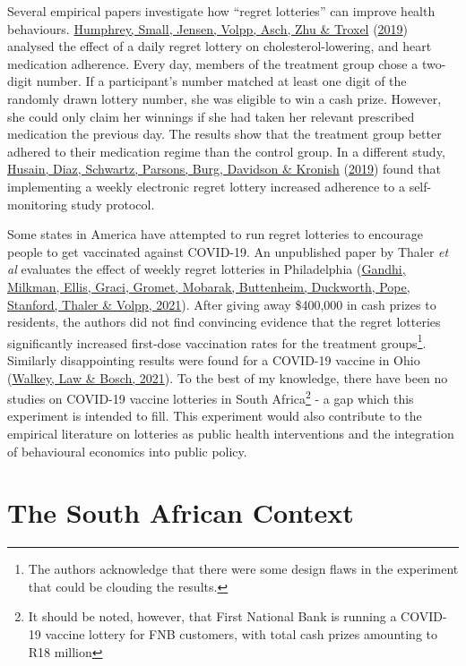 \documentclass[11pt,preprint, authoryear]{elsarticle}
\numberwithin{equation}{section}
\numberwithin{figure}{section}
\numberwithin{table}{section}
\let\rmarkdownfootnote\footnote%
\def\footnote{\protect\rmarkdownfootnote}
\begin{document}
Several empirical papers investigate how ``regret lotteries'' can
improve health behaviours. \protect\hyperlink{ref-adhere}{Humphrey,
Small, Jensen, Volpp, Asch, Zhu \& Troxel}
(\protect\hyperlink{ref-adhere}{2019}) analysed the effect of a daily
regret lottery on cholesterol-lowering, and heart medication adherence.
Every day, members of the treatment group chose a two-digit number. If a
participant's number matched at least one digit of the randomly drawn
lottery number, she was eligible to win a cash prize. However, she could
only claim her winnings if she had taken her relevant prescribed
medication the previous day. The results show that the treatment group
better adhered to their medication regime than the control group. In a
different study, \protect\hyperlink{ref-regr}{Husain, Diaz, Schwartz,
Parsons, Burg, Davidson \& Kronish} (\protect\hyperlink{ref-regr}{2019})
found that implementing a weekly electronic regret lottery increased
adherence to a self-monitoring study protocol.

Some states in America have attempted to run regret lotteries to
encourage people to get vaccinated against COVID-19. An unpublished
paper by Thaler \emph{et al} evaluates the effect of weekly regret
lotteries in Philadelphia (\protect\hyperlink{ref-duck}{Gandhi, Milkman,
Ellis, Graci, Gromet, Mobarak, Buttenheim, Duckworth, Pope, Stanford,
Thaler \& Volpp, 2021}). After giving away \$400,000 in cash prizes to
residents, the authors did not find convincing evidence that the regret
lotteries significantly increased first-dose vaccination rates for the
treatment groups\footnote{The authors acknowledge that there were some
  design flaws in the experiment that could be clouding the results.}.
Similarly disappointing results were found for a COVID-19 vaccine in
Ohio (\protect\hyperlink{ref-ohio}{Walkey, Law \& Bosch, 2021}). To the
best of my knowledge, there have been no studies on COVID-19 vaccine
lotteries in South Africa\footnote{It should be noted, however, that
  First National Bank is running a COVID-19 vaccine lottery for FNB
  customers, with total cash prizes amounting to R18 million} - a gap
which this experiment is intended to fill. This experiment would also
contribute to the empirical literature on lotteries as public health
interventions and the integration of behavioural economics into public
policy.

\hypertarget{the-south-african-context}{%
\section{\texorpdfstring{The South African Context
\label{context}}{The South African Context }}\label{the-south-african-context}}
\end{document}

